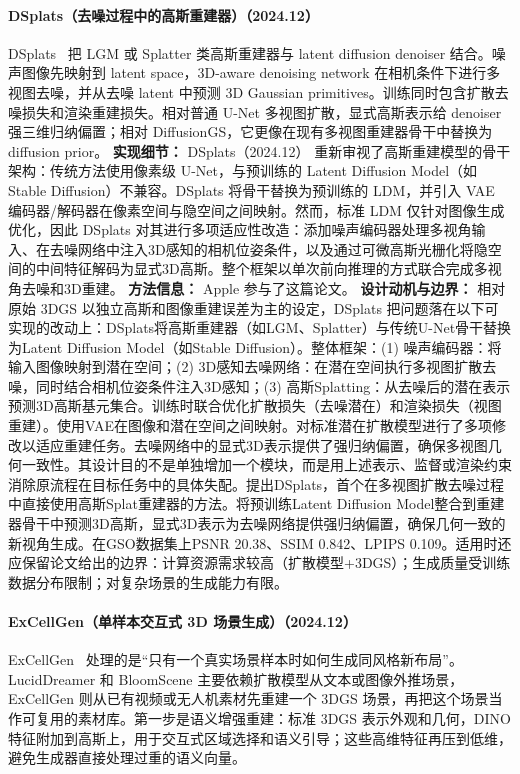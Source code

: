 \paragraph{DSplats（去噪过程中的高斯重建器）（2024.12）}
DSplats~\cite{2412_09648} 把 LGM 或 Splatter 类高斯重建器与 latent diffusion denoiser 结合。噪声图像先映射到 latent space，3D-aware denoising network 在相机条件下进行多视图去噪，并从去噪 latent 中预测 3D Gaussian primitives。训练同时包含扩散去噪损失和渲染重建损失。相对普通 U-Net 多视图扩散，显式高斯表示给 denoiser 强三维归纳偏置；相对 DiffusionGS，它更像在现有多视图重建器骨干中替换为 diffusion prior。
\textbf{实现细节：} DSplats（2024.12） 重新审视了高斯重建模型的骨干架构：传统方法使用像素级 U-Net，与预训练的 Latent Diffusion Model（如 Stable Diffusion）不兼容。DSplats 将骨干替换为预训练的 LDM，并引入 VAE 编码器/解码器在像素空间与隐空间之间映射。然而，标准 LDM 仅针对图像生成优化，因此 DSplats 对其进行多项适应性改造：添加噪声编码器处理多视角输入、在去噪网络中注入3D感知的相机位姿条件，以及通过可微高斯光栅化将隐空间的中间特征解码为显式3D高斯。整个框架以单次前向推理的方式联合完成多视角去噪和3D重建。
\textbf{方法信息：} Apple 参与了这篇论文。
\textbf{设计动机与边界：} 相对原始 3DGS 以独立高斯和图像重建误差为主的设定，DSplats 把问题落在以下可实现的改动上：DSplats将高斯重建器（如LGM、Splatter）与传统U-Net骨干替换为Latent Diffusion Model（如Stable Diffusion）。整体框架：(1) 噪声编码器：将输入图像映射到潜在空间；(2) 3D感知去噪网络：在潜在空间执行多视图扩散去噪，同时结合相机位姿条件注入3D感知；(3) 高斯Splatting：从去噪后的潜在表示预测3D高斯基元集合。训练时联合优化扩散损失（去噪潜在）和渲染损失（视图重建）。使用VAE在图像和潜在空间之间映射。对标准潜在扩散模型进行了多项修改以适应重建任务。去噪网络中的显式3D表示提供了强归纳偏置，确保多视图几何一致性。其设计目的不是单独增加一个模块，而是用上述表示、监督或渲染约束消除原流程在目标任务中的具体失配。提出DSplats，首个在多视图扩散去噪过程中直接使用高斯Splat重建器的方法。将预训练Latent Diffusion Model整合到重建器骨干中预测3D高斯，显式3D表示为去噪网络提供强归纳偏置，确保几何一致的新视角生成。在GSO数据集上PSNR 20.38、SSIM 0.842、LPIPS 0.109。适用时还应保留论文给出的边界：计算资源需求较高（扩散模型+3DGS）；生成质量受训练数据分布限制；对复杂场景的生成能力有限。
\paragraph{ExCellGen（单样本交互式 3D 场景生成）（2024.12）}
ExCellGen~\cite{2412_16253} 处理的是“只有一个真实场景样本时如何生成同风格新布局”。LucidDreamer 和 BloomScene 主要依赖扩散模型从文本或图像外推场景，ExCellGen 则从已有视频或无人机素材先重建一个 3DGS 场景，再把这个场景当作可复用的素材库。第一步是语义增强重建：标准 3DGS 表示外观和几何，DINO 特征附加到高斯上，用于交互式区域选择和语义引导；这些高维特征再压到低维，避免生成器直接处理过重的语义向量。

